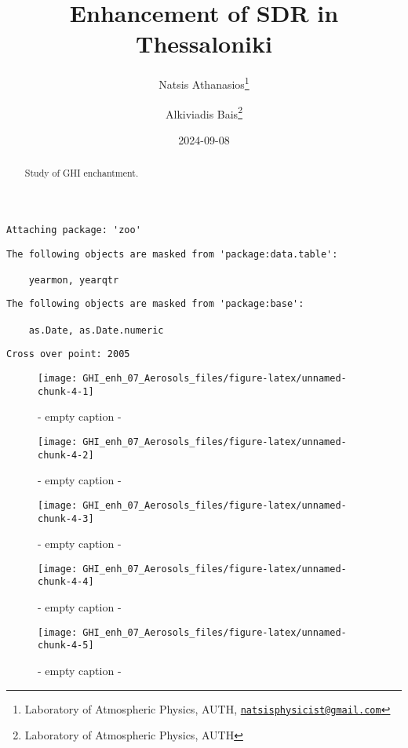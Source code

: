 \documentclass[
  10pt,
  a4paper,oneside]{article}
\title{Enhancement of SDR in Thessaloniki}
\author{Natsis Athanasios\footnote{Laboratory of Atmospheric Physics, AUTH, \href{mailto:natsisphysicist@gmail.com}{\nolinkurl{natsisphysicist@gmail.com}}} \and Alkiviadis Bais\footnote{Laboratory of Atmospheric Physics, AUTH}}
\date{2024-09-08}
\begin{document}
\maketitle
\begin{abstract}
Study of GHI enchantment.
\end{abstract}

{
\hypersetup{linkcolor=}
\setcounter{tocdepth}{4}
\tableofcontents
}
\begin{verbatim}
Attaching package: 'zoo'
\end{verbatim}

\begin{verbatim}
The following objects are masked from 'package:data.table':

    yearmon, yearqtr
\end{verbatim}

\begin{verbatim}
The following objects are masked from 'package:base':

    as.Date, as.Date.numeric
\end{verbatim}

\begin{verbatim}
Cross over point: 2005 
\end{verbatim}

\begin{figure}[H]

{\centering \texttt{[image: GHI\_enh\_07\_Aerosols\_files/figure-latex/unnamed-chunk-4-1]} 

}

\caption{ - empty caption - }\label{fig:unnamed-chunk-4-1}
\end{figure}
\begin{figure}[H]

{\centering \texttt{[image: GHI\_enh\_07\_Aerosols\_files/figure-latex/unnamed-chunk-4-2]} 

}

\caption{ - empty caption - }\label{fig:unnamed-chunk-4-2}
\end{figure}
\begin{figure}[H]

{\centering \texttt{[image: GHI\_enh\_07\_Aerosols\_files/figure-latex/unnamed-chunk-4-3]} 

}

\caption{ - empty caption - }\label{fig:unnamed-chunk-4-3}
\end{figure}
\begin{figure}[H]

{\centering \texttt{[image: GHI\_enh\_07\_Aerosols\_files/figure-latex/unnamed-chunk-4-4]} 

}

\caption{ - empty caption - }\label{fig:unnamed-chunk-4-4}
\end{figure}
\begin{figure}[H]

{\centering \texttt{[image: GHI\_enh\_07\_Aerosols\_files/figure-latex/unnamed-chunk-4-5]} 

}

\caption{ - empty caption - }\label{fig:unnamed-chunk-4-5}
\end{figure}
\end{document}
